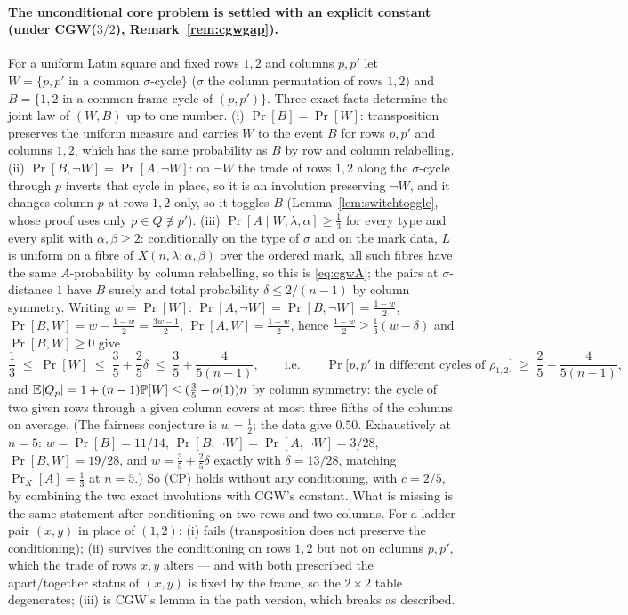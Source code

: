 \paragraph{The unconditional core problem is settled with an explicit constant (under CGW($3/2$), Remark~\ref{rem:cgwgap}).}
For a uniform Latin square and fixed rows $1,2$ and columns $p,p'$ let
$W=\{p,p'\text{ in a common }\sigma\text{-cycle}\}$ ($\sigma$ the column
permutation of rows $1,2$) and $B=\{1,2\text{ in a common frame cycle
of }(p,p')\}$.  Three exact facts determine the joint law of $(W,B)$
up to one number.  (i) $\Pr[B]=\Pr[W]$: transposition preserves the
uniform measure and carries $W$ to the event $B$ for rows $p,p'$ and
columns $1,2$, which has the same probability as $B$ by row and
column relabelling.  (ii) $\Pr[B,\neg W]=\Pr[A,\neg W]$: on $\neg W$
the trade of rows $1,2$ along the $\sigma$-cycle through $p$ inverts
that cycle in place, so it is an involution preserving $\neg W$, and
it changes column $p$ at rows $1,2$ only, so it toggles $B$
(Lemma~\ref{lem:switchtoggle}, whose proof uses only
$p\in Q\not\ni p'$).  (iii) $\Pr[A\mid W,\lambda,\alpha]\ge\frac13$
for every type and every split with $\alpha,\beta\ge2$: conditionally
on the type of $\sigma$ and on the mark data, $L$ is uniform on a
fibre of $X(n,\lambda;\alpha,\beta)$ over the ordered mark, all such
fibres have the same $A$-probability by column relabelling, so this
is \eqref{eq:cgwA}; the pairs at $\sigma$-distance $1$ have $B$ surely
and total probability $\delta\le2/(n-1)$ by column symmetry.
Writing $w=\Pr[W]$: $\Pr[A,\neg W]=\Pr[B,\neg W]=\frac{1-w}2$,
$\Pr[B,W]=w-\frac{1-w}2=\frac{3w-1}2$, $\Pr[A,W]=\frac{1-w}2$, hence
$\frac{1-w}2\ge\frac13(w-\delta)$ and $\Pr[B,W]\ge0$ give
\[
\frac13\;\le\;\Pr[W]\;\le\;\frac35+\frac25\delta\;\le\;\frac35+\frac{4}{5(n-1)},
\qquad\text{i.e.}\qquad
\Pr\bigl[p,p'\text{ in different cycles of }\rho_{1,2}\bigr]\;\ge\;\frac25-\frac{4}{5(n-1)},
\]
and $\mathbb{E}|Q_p|=1+(n-1)\mathbb{P}[W]\le(\frac35+o(1))n$ by column symmetry: the
cycle of two given rows through a given column covers at most three
fifths of the columns on average.  (The fairness conjecture is
$w=\frac12$; the data give $0.50$.  Exhaustively at $n=5$:
$w=\Pr[B]=11/14$, $\Pr[B,\neg W]=\Pr[A,\neg W]=3/28$,
$\Pr[B,W]=19/28$, and $w=\frac35+\frac25\delta$ exactly with
$\delta=13/28$, matching $\Pr_X[A]=\frac13$ at $n=5$.)  So (CP) holds
without any conditioning, with $c=2/5$, by combining the two exact
involutions with CGW's constant.  What is missing is the same
statement after conditioning on two rows and two columns.  For a
ladder pair $(x,y)$ in place of $(1,2)$: (i) fails (transposition does
not preserve the conditioning); (ii) survives the conditioning on rows
$1,2$ but not on columns $p,p'$, which the trade of rows $x,y$ alters
--- and with both prescribed the apart/together status of $(x,y)$ is
fixed by the frame, so the $2\times2$ table degenerates; (iii) is
CGW's lemma in the path version, which breaks as described.

